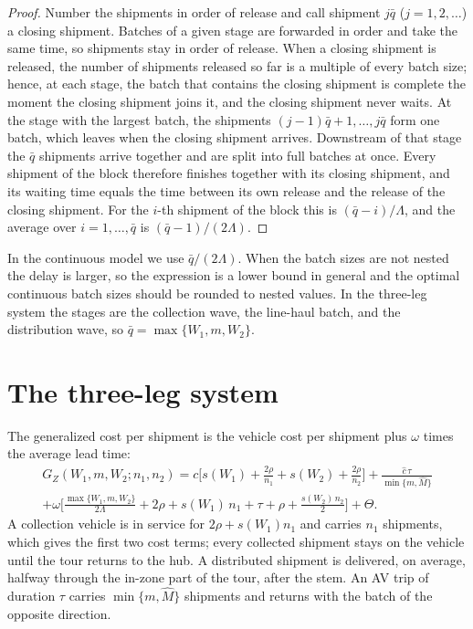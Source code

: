 \documentclass[10pt, reqno]{amsart}
\theoremstyle{definition}
\begin{document}
\begin{proof}
Number the shipments in order of release and call shipment $j\bar q$ ($j=1,2,\dots$) a closing shipment. Batches of a given stage are forwarded in order and take the same time, so shipments stay in order of release. When a closing shipment is released, the number of shipments released so far is a multiple of every batch size; hence, at each stage, the batch that contains the closing shipment is complete the moment the closing shipment joins it, and the closing shipment never waits. At the stage with the largest batch, the shipments $(j-1)\bar q+1,\dots,j\bar q$ form one batch, which leaves when the closing shipment arrives. Downstream of that stage the $\bar q$ shipments arrive together and are split into full batches at once. Every shipment of the block therefore finishes together with its closing shipment, and its waiting time equals the time between its own release and the release of the closing shipment. For the $i$-th shipment of the block this is $(\bar q-i)/\Lambda$, and the average over $i=1,\dots,\bar q$ is $(\bar q-1)/(2\Lambda)$.
\end{proof}

In the continuous model we use $\bar q/(2\Lambda)$. When the batch sizes are not nested the delay is larger, so the expression is a lower bound in general and the optimal continuous batch sizes should be rounded to nested values. In the three-leg system the stages are the collection wave, the line-haul batch, and the distribution wave, so $\bar q=\max\{W_1,m,W_2\}$.

\section{The three-leg system}

The generalized cost per shipment is the vehicle cost per shipment plus $\omega$ times the average lead time:
\begin{multline}\label{eq:GZfull}
G_Z(W_1,m,W_2;n_1,n_2)=c\Big[s(W_1)+\frac{2\rho}{n_1}+s(W_2)+\frac{2\rho}{n_2}\Big]+\frac{\hat c\,\tau}{\min\{m,\hat M\}}\\
+\omega\Big[\frac{\max\{W_1,m,W_2\}}{2\Lambda}+2\rho+s(W_1)\,n_1+\tau+\rho+\frac{s(W_2)\,n_2}{2}\Big]+\Theta .
\end{multline}
A collection vehicle is in service for $2\rho+s(W_1)n_1$ and carries $n_1$ shipments, which gives the first two cost terms; every collected shipment stays on the vehicle until the tour returns to the hub. A distributed shipment is delivered, on average, halfway through the in-zone part of the tour, after the stem. An AV trip of duration $\tau$ carries $\min\{m,\hat M\}$ shipments and returns with the batch of the opposite direction.
\end{document}
